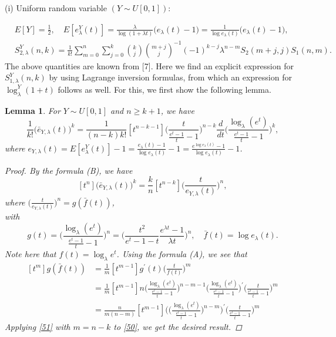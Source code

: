 \documentclass[a4paper,11pt]{amsart}
\newtheorem{lemma}[theorem]{Lemma}
\begin{document}
(i) Uniform random variable $(Y \sim U[0,1])$: \par
\begin{align*}
&E[Y]=\frac{1}{2}, \quad   E[e_{\lambda}^{Y}(t)]=\frac{\lambda}{\log(1+\lambda t)}\big(e_{\lambda}(t)-1\big)=\frac{1}{\log e_{\lambda}(t)}\big(e_{\lambda}(t)-1\big),  \\
&S_{2,\lambda}^{Y}(n,k)= \frac{1}{k!}\sum_{m=0}^{n}\sum_{j=0}^{k}\binom{k}{j}\binom{m+j}{j}^{-1}(-1)^{k-j}\lambda^{n-m}S_{2}(m+j,j)S_{1}(n,m).      
\end{align*}
The above quantities are known from [7]. Here we find an explicit expression for $S_{1,\lambda}^{Y}(n,k)$ by using Lagrange inversion formulas, from which an expression for $\log_{\lambda}^{Y}(1+t)$ follows as well.
For this, we first show the following lemma.
\begin{lemma}
For $Y \sim U[0,1]$ and $n \ge k+1$, we have
\begin{equation*}
[t^{n}]\frac{1}{k!}\big(\bar{e}_{Y,\lambda}(t)\big)^{k}=\frac{1}{(n-k)k!}[t^{n-k-1}]\bigg(\frac{t}{\frac{e^{t}-1}{t}-1}\bigg)^{n-k}\frac{d}{dt}\bigg(\frac{\log_{\lambda}(e^{t})}{\frac{e^{t}-1}{t}-1} \bigg)^{k},
\end{equation*}
where $e_{Y,\lambda}(t)=E[e_{\lambda}^{Y}(t)]-1=\frac{e_{\lambda}(t)-1}{\log e_{\lambda}(t)}-1=\frac{e^{\log e_{\lambda}(t)}-1}{\log e_{\lambda}(t)}-1$.
\begin{proof}
By the formula (B), we have
\begin{equation} \label{50}
[t^{n}]\big(\bar{e}_{Y,\lambda}(t)\big)^{k}=\frac{k}{n}[t^{n-k}]\Big(\frac{t}{e_{Y,\lambda}(t)}\Big)^{n},
\end{equation}
where $\big(\frac{t}{e_{Y,\lambda}(t)}\big)^{n}=g(\bar{f}(t))$, \\
with
\begin{equation*}
g(t)=\bigg(\frac{\log_{\lambda}(e^{t})}{\frac{e^{t}-1}{t}-1}\bigg)^{n}=\bigg(\frac{t^{2}}{e^{t}-1-t}\frac{e^{\lambda t}-1}{\lambda t}\bigg)^{n},\quad \bar{f}(t)=\log e_{\lambda}(t).
\end{equation*}
Note here that $f(t)=\log_{\lambda}e^{t}$. Using the formula (A), we see that
\begin{equation} \label{51}
\begin{aligned} 
[t^{m}]g(\bar{f}(t))&=\frac{1}{m}[t^{m-1}]g^{\prime}(t)\Big(\frac{t}{f(t)}\Big)^{m} \\
&=\frac{1}{m}[t^{m-1}]n\bigg(\frac{\log_{\lambda}(e^{t})}{\frac{e^{t}-1}{t}-1}\bigg)^{n-m-1}\bigg(\frac{\log_{\lambda}(e^{t})}{\frac{e^{t}-1}{t}-1}\bigg)^{\prime}\bigg(\frac{t}{\frac{e^{t}-1}{t}-1}\bigg)^{m} \\
&=\frac{n}{m(n-m)}[t^{m-1}]\bigg(\bigg(\frac{\log_{\lambda}(e^{t})}{\frac{e^{t}-1}{t}-1}\bigg)^{n-m}\bigg)^{\prime}\bigg(\frac{t}{\frac{e^{t}-1}{t}-1}\bigg)^{m}
\end{aligned}
\end{equation}
Applying \eqref{51} with $m=n-k$ to \eqref{50}, we get the desired result.
\end{proof}
\end{lemma}
\end{document}
